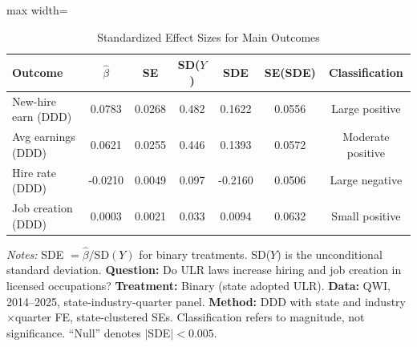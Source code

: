 \begin{table}[H]
\centering
\caption{Standardized Effect Sizes for Main Outcomes}
\label{tab:sde}
\begin{adjustbox}{max width=\textwidth}
\begin{tabular}{lcccccc}
\toprule
Outcome & $\hat{\beta}$ & SE & SD($Y$) & SDE & SE(SDE) & Classification \\
\midrule
New-hire earn (DDD) & 0.0783 & 0.0268 & 0.482 & 0.1622 & 0.0556 & Large positive \\
Avg earnings (DDD) & 0.0621 & 0.0255 & 0.446 & 0.1393 & 0.0572 & Moderate positive \\
Hire rate (DDD) & -0.0210 & 0.0049 & 0.097 & -0.2160 & 0.0506 & Large negative \\
Job creation (DDD) & 0.0003 & 0.0021 & 0.033 & 0.0094 & 0.0632 & Small positive \\
\bottomrule
\end{tabular}
\end{adjustbox}

\vspace{0.5em}
{\small \emph{Notes:} SDE $= \hat{\beta} / \text{SD}(Y)$ for binary treatments. SD($Y$) is the unconditional standard deviation. \textbf{Question:} Do ULR laws increase hiring and job creation in licensed occupations? \textbf{Treatment:} Binary (state adopted ULR). \textbf{Data:} QWI, 2014--2025, state-industry-quarter panel. \textbf{Method:} DDD with state and industry${\times}$quarter FE, state-clustered SEs. Classification refers to magnitude, not significance. ``Null'' denotes $|$SDE$| < 0.005$.}
\end{table}

